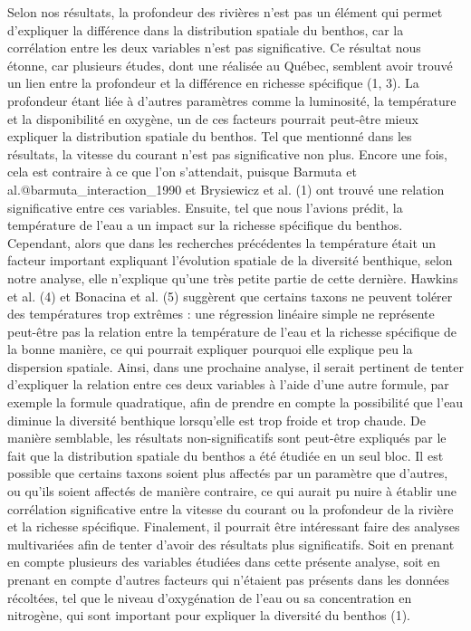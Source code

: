 \documentclass[9pt,twocolumn,twoside,]{pnas-new}
\begin{document}
Selon nos résultats, la profondeur des rivières n'est pas un élément qui
permet d'expliquer la différence dans la distribution spatiale du
benthos, car la corrélation entre les deux variables n'est pas
significative. Ce résultat nous étonne, car plusieurs études, dont une
réalisée au Québec, semblent avoir trouvé un lien entre la profondeur et
la différence en richesse spécifique (1, 3). La profondeur étant liée à
d'autres paramètres comme la luminosité, la température et la
disponibilité en oxygène, un de ces facteurs pourrait peut-être mieux
expliquer la distribution spatiale du benthos. Tel que mentionné dans
les résultats, la vitesse du courant n'est pas significative non plus.
Encore une fois, cela est contraire à ce que l'on s'attendait, puisque
Barmuta et al.@barmuta\_interaction\_1990 et Brysiewicz et al. (1) ont
trouvé une relation significative entre ces variables. Ensuite, tel que
nous l'avions prédit, la température de l'eau a un impact sur la
richesse spécifique du benthos. Cependant, alors que dans les recherches
précédentes la température était un facteur important expliquant
l'évolution spatiale de la diversité benthique, selon notre analyse,
elle n'explique qu'une très petite partie de cette dernière. Hawkins et
al. (4) et Bonacina et al. (5) suggèrent que certains taxons ne peuvent
tolérer des températures trop extrêmes : une régression linéaire simple
ne représente peut-être pas la relation entre la température de l'eau et
la richesse spécifique de la bonne manière, ce qui pourrait expliquer
pourquoi elle explique peu la dispersion spatiale. Ainsi, dans une
prochaine analyse, il serait pertinent de tenter d'expliquer la relation
entre ces deux variables à l'aide d'une autre formule, par exemple la
formule quadratique, afin de prendre en compte la possibilité que l'eau
diminue la diversité benthique lorsqu'elle est trop froide et trop
chaude. De manière semblable, les résultats non-significatifs sont
peut-être expliqués par le fait que la distribution spatiale du benthos
a été étudiée en un seul bloc. Il est possible que certains taxons
soient plus affectés par un paramètre que d'autres, ou qu'ils soient
affectés de manière contraire, ce qui aurait pu nuire à établir une
corrélation significative entre la vitesse du courant ou la profondeur
de la rivière et la richesse spécifique. Finalement, il pourrait être
intéressant faire des analyses multivariées afin de tenter d'avoir des
résultats plus significatifs. Soit en prenant en compte plusieurs des
variables étudiées dans cette présente analyse, soit en prenant en
compte d'autres facteurs qui n'étaient pas présents dans les données
récoltées, tel que le niveau d'oxygénation de l'eau ou sa concentration
en nitrogène, qui sont important pour expliquer la diversité du benthos
(1).
\end{document}
